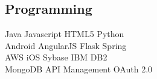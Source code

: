 \documentclass[]{deedy-resume-openfont}
\begin{document}
\begin{minipage}[t]{0.33\textwidth}
\subsection{Programming}
Java \textbullet{}   Javascript \textbullet{} HTML5 \textbullet{} Python \\
Android \textbullet{}   AngularJS \textbullet{} Flask \textbullet{} Spring \\
AWS \textbullet{} iOS \textbullet{} Sybase \textbullet{} IBM DB2 \\
MongoDB \textbullet{} API Management \textbullet{} OAuth 2.0 \\
\sectionsep

%
%

\end{minipage} 
\hfill
\end{document}
